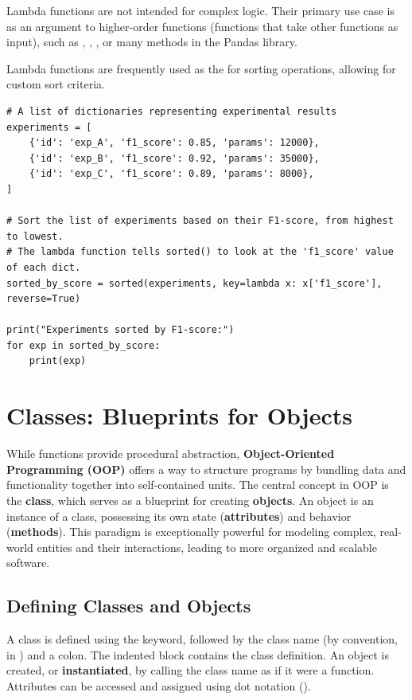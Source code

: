 Lambda functions are not intended for complex logic. Their primary use case is as an argument to higher-order functions (functions that take other functions as input), such as , , , or many methods in the Pandas library.

\begin{example}
Lambda functions are frequently used as the  for sorting operations, allowing for custom sort criteria.
\text{ }\begin{verbatim}
# A list of dictionaries representing experimental results
experiments = [
    {'id': 'exp_A', 'f1_score': 0.85, 'params': 12000},
    {'id': 'exp_B', 'f1_score': 0.92, 'params': 35000},
    {'id': 'exp_C', 'f1_score': 0.89, 'params': 8000},
]

# Sort the list of experiments based on their F1-score, from highest to lowest.
# The lambda function tells sorted() to look at the 'f1_score' value of each dict.
sorted_by_score = sorted(experiments, key=lambda x: x['f1_score'], reverse=True)

print("Experiments sorted by F1-score:")
for exp in sorted_by_score:
    print(exp)
\end{verbatim}
\end{example}


\section{Classes: Blueprints for Objects}
\label{sec:classes_objects}
While functions provide procedural abstraction, \textbf{Object-Oriented Programming (OOP)} offers a way to structure programs by bundling data and functionality together into self-contained units. The central concept in OOP is the \textbf{class}, which serves as a blueprint for creating \textbf{objects}. An object is an instance of a class, possessing its own state (\textbf{attributes}) and behavior (\textbf{methods}). This paradigm is exceptionally powerful for modeling complex, real-world entities and their interactions, leading to more organized and scalable software.

\subsection{Defining Classes and Objects}
\label{subsec:class_definition}
A class is defined using the  keyword, followed by the class name (by convention, in ) and a colon. The indented block contains the class definition. An object is created, or \textbf{instantiated}, by calling the class name as if it were a function. Attributes can be accessed and assigned using dot notation ().

